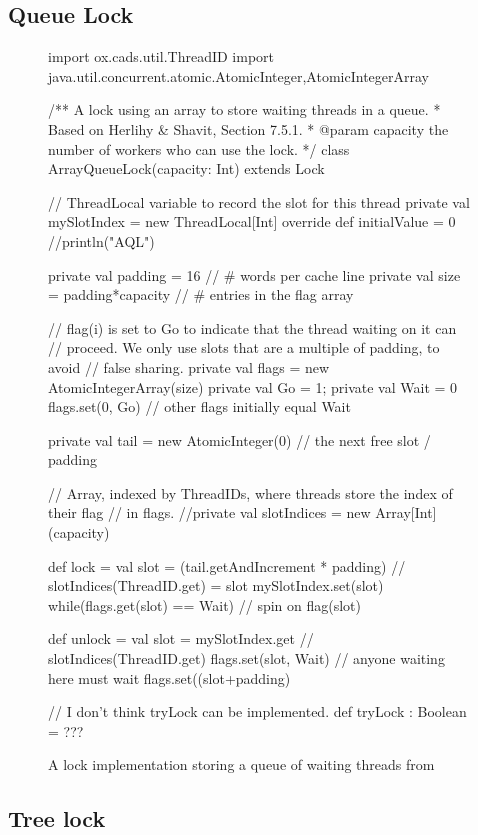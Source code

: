 \subsection{Queue Lock}

\begin{figure}
  \begin{scala}
    import ox.cads.util.ThreadID
    import java.util.concurrent.atomic.{AtomicInteger,AtomicIntegerArray}

    /** A lock using an array to store waiting threads in a queue.
      * Based on Herlihy & Shavit, Section 7.5.1.
      * @param capacity the number of workers who can use the lock. */ 
    class ArrayQueueLock(capacity: Int) extends Lock{
      // ThreadLocal variable to record the slot for this thread
      private val mySlotIndex = 
        new ThreadLocal[Int]{ override def initialValue = 0 }
      //println("AQL")

      private val padding = 16 // # words per cache line 
      private val size = padding*capacity // # entries in the flag array

      // flag(i) is set to Go to indicate that the thread waiting on it can
      // proceed.  We only use slots that are a multiple of padding, to avoid
      // false sharing.
      private val flags = new AtomicIntegerArray(size)
      private val Go = 1; private val Wait = 0
      flags.set(0, Go) // other flags initially equal Wait

      private val tail = new AtomicInteger(0) // the next free slot / padding

      // Array, indexed by ThreadIDs, where threads store the index of their flag
      // in flags.
      //private val slotIndices = new Array[Int](capacity)

      def lock = {
        val slot = (tail.getAndIncrement * padding) %
        // slotIndices(ThreadID.get) = slot
        mySlotIndex.set(slot)
        while(flags.get(slot) == Wait){ } // spin on flag(slot)
      }

      def unlock = {
        val slot = mySlotIndex.get // slotIndices(ThreadID.get)
        flags.set(slot, Wait) // anyone waiting here must wait
        flags.set((slot+padding)%
      }

      // I don't think tryLock can be implemented. 
      def tryLock : Boolean = ???
    }
  \end{scala}
  \caption{A lock implementation storing a queue of waiting threads from \cite{TAoMP} \label{fig:QueueScala}}
\end{figure}

\subsection{Tree lock}